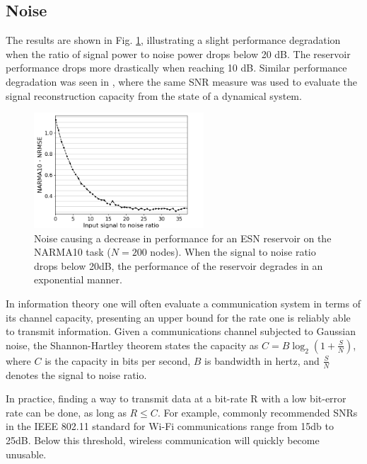 \subsection{Noise}


The results are shown in Fig. \ref{input_noise_snr}, illustrating a slight
performance degradation when the ratio of signal power to noise power drops
below 20 dB. The reservoir performance drops more drastically when reaching 10
dB. Similar performance degradation was seen in \cite{dambre_information_2012},
where the same SNR measure was used to evaluate the signal reconstruction
capacity from the state of a dynamical system.

\begin{figure}
  \centering
  \includegraphics[width=2.5in]{img/input_noise_snr.png}
  \caption{
    Noise causing a decrease in performance for an ESN reservoir on the NARMA10
task ($N = 200$ nodes). When the signal to noise ratio drops below 20dB, the
performance of the reservoir degrades in an exponential manner.
  }
  \label{input_noise_snr}
\end{figure}

In information theory one will often evaluate a communication system in terms of
its channel capacity, presenting an upper bound for the rate one is reliably
able to transmit information. Given a communications channel subjected to
Gaussian noise, the Shannon-Hartley theorem \cite{shannon_communication_1949}
states the capacity as $C = B\log_2(1 + \frac{S}{N})$, where $C$ is the capacity
in bits per second, $B$ is bandwidth in hertz, and $\frac{S}{N}$ denotes the
signal to noise ratio.

In practice, finding a way to transmit data at a bit-rate R with a low bit-error
rate can be done, as long as $R \leq C$. For example, commonly recommended SNRs
in the IEEE 802.11 standard for Wi-Fi communications range from 15db to
25dB. Below this threshold, wireless communication will quickly become unusable.

